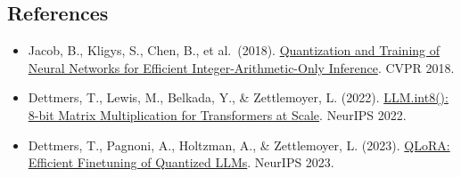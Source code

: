 \FloatBarrier
{}
\hypertarget{references-88}{%
\subsection{References}\label{references-88}}

\vspace{0.25em}
\begin{itemize}
\tightlist
\item
  Jacob, B., Kligys, S., Chen, B., et al.~(2018). \href{https://arxiv.org/abs/1712.05877}{Quantization and Training of Neural Networks for Efficient Integer-Arithmetic-Only Inference}. CVPR 2018.
\item
  Dettmers, T., Lewis, M., Belkada, Y., \& Zettlemoyer, L. (2022). \href{https://arxiv.org/abs/2208.07339}{LLM.int8(): 8-bit Matrix Multiplication for Transformers at Scale}. NeurIPS 2022.
\item
  Dettmers, T., Pagnoni, A., Holtzman, A., \& Zettlemoyer, L. (2023). \href{https://arxiv.org/abs/2305.14314}{QLoRA: Efficient Finetuning of Quantized LLMs}. NeurIPS 2023.
\end{itemize}

\clearpage
